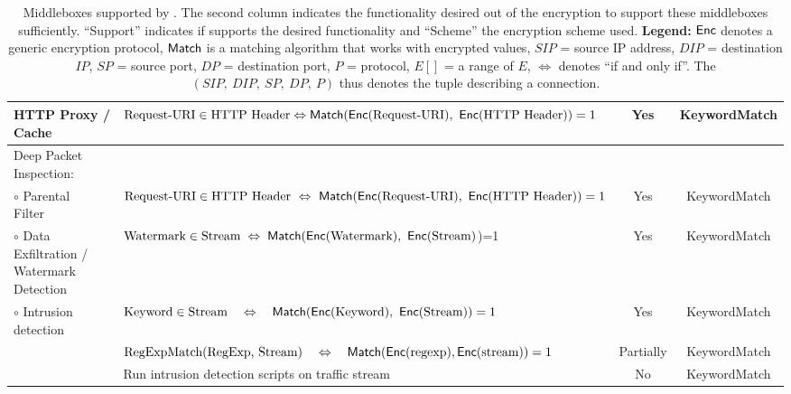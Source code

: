 \begin{table*}[t]
{\begin{tabular}{|>{\raggedright}p{3cm}|>{\raggedright}p{8.7cm}|c|c|}
HTTP Proxy / Cache~\cite{rfc3040, haproxy, squid} &
$ \text{Request-URI} \in \text{HTTP Header} \Leftrightarrow \mathsf{Match}(\mathsf{Enc}(\text{Request-URI}),\ \mathsf{Enc}(\text{HTTP Header}))=1 $
& Yes & KeywordMatch \\ \hline

Deep Packet Inspection: & & & \\


$\circ$ Parental Filter~\cite{squid} &
$ \text{Request-URI} \in \text{HTTP Header}\  \Leftrightarrow\ \Match(\Enc(\text{Request-URI}),\ \Enc(\text{HTTP Header})) = 1$
 &
Yes & KeywordMatch \\
%
%
$\circ$ Data Exfiltration /  Watermark Detection 
&
$\text{Watermark} \in \text{Stream} \hspace{1mm} \Leftrightarrow \hspace{1mm} \Match(\Enc(\text{Watermark}),\ \Enc(\text{Stream})$)=1
 &
Yes & KeywordMatch \\ 
%
%
$\circ$ Intrusion detection~\cite{snort, bro}
&
$ \text{Keyword} \in \text{Stream} \quad \Leftrightarrow \quad   \Match(\Enc(\text{Keyword}),\ \Enc(\text{Stream}))=1$
&
Yes & KeywordMatch \\ 
%
%
&
$\text{RegExpMatch(RegExp, Stream)} \quad \Leftrightarrow \quad \mathsf{Match}(\mathsf{Enc}(\text{regexp}),\mathsf{Enc}(\text{stream}))=1$
&
Partially & KeywordMatch \\

&
Run intrusion detection scripts on traffic stream
 &
No & KeywordMatch \\



 \hline

\end{tabular}
}

\caption[]{Middleboxes supported by \sys. The second column indicates the functionality desired out of the encryption to support these middleboxes sufficiently. ``Support'' indicates if \sys supports the desired functionality  and ``Scheme'' the encryption scheme used.  {\bf Legend:} $\mathsf{Enc}$ denotes a generic encryption protocol, $\mathsf{Match}$ is a matching algorithm that works with encrypted values, $SIP$ = source IP address, $DIP$ = destination $IP$, $SP$ = source port, $DP$ = destination port, $P$ = protocol,  $E[]$ = a range of $E$, $\Leftrightarrow$ denotes ``if and only if''. The $(SIP,\ DIP,\ SP,\ DP,\ P)$ thus denotes the tuple describing a connection. \label{tbl:mbreqs}} 
\end{table*}


